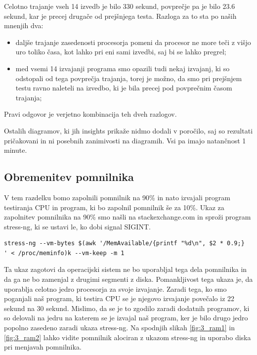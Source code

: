 Celotno trajanje vseh 14 izvedb je bilo 330 sekund, povprečje pa je bilo 23.6 sekund, kar je precej drugače od prejšnjega testa. Razloga za to sta po naših mnenjih dva:
\begin{itemize}
	\item daljše trajanje zasedenosti procesorja pomeni da procesor ne more teči z višjo uro toliko časa, kot lahko pri eni sami izvedbi, saj bi se lahko pregrel;
	\item med vsemi 14 izvajanji programa smo opazili tudi nekaj izvajanj, ki so odstopali od tega povprečja trajanja, torej je možno, da smo pri prejšnjem testu ravno naleteli na izvedbo, ki je bila precej pod povprečnim časom trajanja;
\end{itemize}
Pravi odgovor je verjetno kombinacija teh dveh razlogov.

Ostalih diagramov, ki jih insights prikaže nidmo dodali v poročilo, saj so rezultati pričakovani in ni posebnih zanimivosti na diagramih. Vsi pa imajo natančnost 1 minute.




\subsection{Obremenitev pomnilnika}

V tem razdelku bomo zapolnili pomnilnik na 90\% in nato izvajali program testiranja CPU in program, ki bo zapolnil pomnilnik še za 10\%.
Ukaz za zapolnitev pomnilnika na 90\% smo našli na stackexchange.com \cite{mem90Fill} in sproži program stress-ng, ki se ustavi le, ko dobi signal SIGINT.
\begin{verbatim}
stress-ng --vm-bytes $(awk '/MemAvailable/{printf "%d\n", $2 * 0.9;}
' < /proc/meminfo)k --vm-keep -m 1
\end{verbatim}
Ta ukaz zagotovi da operacijski sistem ne bo uporabljal tega dela pomnilnika in da ga ne bo zamenjal z drugimi segmenti z diska. Pomankljivost tega ukaza je, da uporablja celotno jedro procesorja za svoje izvajanje. Zaradi tega, ko smo poganjali naš program, ki testira CPU se je njegovo 
izvajanje povečalo iz 22 sekund na 30 sekund. Mislimo, da se je to zgodilo zaradi dodatnih programov, ki so delovali na jedru na katerem se je izvajal naš program, ker je bilo drugo jedro popolno zasedeno zaradi ukaza stress-ng. Na spodnjih slikah \ref{fig:3_ram1} in \ref{fig:3_ram2} lahko vidite pomnilnik alociran z ukazom stress-ng in uporabo diska pri menjavah pomnilnika. 


